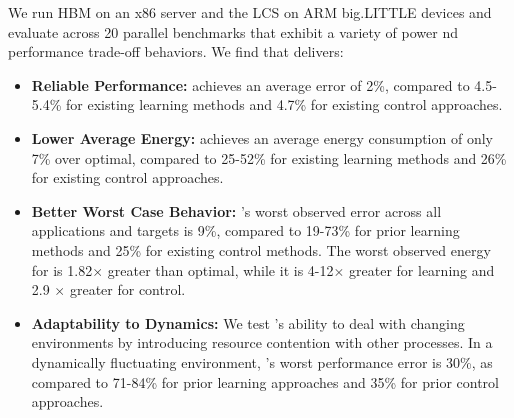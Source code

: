 {%



We run HBM on an x86 server and the LCS on ARM big.LITTLE devices and
evaluate across 20 parallel benchmarks that exhibit a variety of power
nd performance trade-off behaviors.  We find that \SYSTEM{} delivers:
\begin{itemize}
\item \textbf{Reliable Performance: } \SYSTEM{} achieves an average
  error of 2\%, compared to 4.5-5.4\% for existing learning methods
  and 4.7\% for existing control approaches.
\item \textbf{Lower Average Energy:} \SYSTEM{} achieves an average
  energy consumption of only 7\% over optimal, compared to 25-52\% for
  existing learning methods and 26\% for existing control approaches.
\item \textbf{Better Worst Case Behavior:} \SYSTEM{}'s worst observed
  error across all applications and targets is 9\%, compared to
  19-73\% for prior learning methods and 25\% for existing control
  methods.  The worst observed energy for \SYSTEM{} is 1.82$\times$
  greater than optimal, while it is 4-12$\times$ greater for learning
  and 2.9 $\times$ greater for control.
\item \textbf{Adaptability to Dynamics:} We test \SYSTEM{}'s ability
  to deal with changing environments by introducing resource
  contention with other processes.  In a dynamically fluctuating
  environment, \SYSTEM{}'s worst performance error is 30\%, as
  compared to 71-84\% for prior learning approaches and 35\% for prior
  control approaches.
\end{itemize}

}
